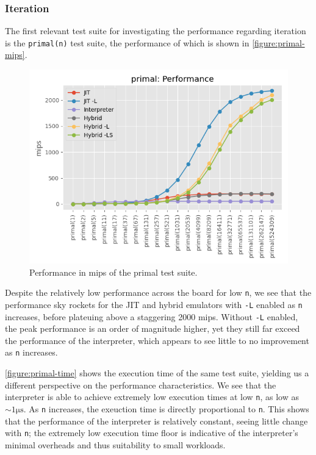 \subsubsection{Iteration}
\label{section:perf-iteration}

The first relevant test suite for investigating the performance regarding iteration is the \texttt{primal(n)} test suite, the performance of which is shown in \autoref{figure:primal-mips}.

\begin{figure}[H]
    \centering
    \includegraphics[scale=0.75]{output/graphs/tests/all/primal/mips.png}
    \caption{Performance in mips of the primal test suite.}
    \label{figure:primal-mips}
\end{figure}

Despite the relatively low performance across the board for low \texttt{n}, we see that the performance sky rockets for the JIT and hybrid emulators with \texttt{-L} enabled as \texttt{n} increases, before plateuing above a staggering 2000 mips. Without \texttt{-L} enabled, the peak performance is an order of magnitude higher, yet they still far exceed the performance of the interpreter, which appears to see little to no improvement as \texttt{n} increases.

\autoref{figure:primal-time} shows the execution time of the same test suite, yielding us a different perspective on the performance characteristics. We see that the interpreter is able to achieve extremely low execution times at low \texttt{n}, as low as $\sim1\si{\micro\second}$. As \texttt{n} increases, the exeuction time is directly proportional to \texttt{n}. This shows that the performance of the interpreter is relatively constant, seeing little change with \texttt{n}; the extremely low execution time floor is indicative of the interpreter's minimal overheads and thus suitability to small workloads.

